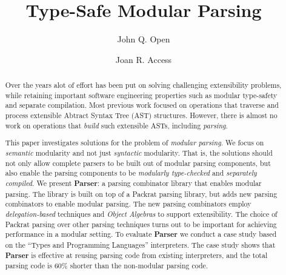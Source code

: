 \documentclass[a4paper,UKenglish]{lipics}
\title{Type-Safe Modular Parsing}
\author[1]{John Q. Open}
\author[2]{Joan R. Access}
\affil[1]{Dummy University Computing Laboratory\\
  Address, Country\\
  \texttt{open@dummyuni.org}}
\affil[2]{Department of Informatics, Dummy College\\
  Address, Country\\
  \texttt{access@dummycollege.org}}
\newcommand\name{\textbf{Parser}\xspace}
\begin{document}
\maketitle

\begin{abstract}

  Over the years alot of effort has been put on solving challenging
  extensibility problems, while retaining important software
  engineering properties such as modular type-safety and
  separate compilation. Most previous work focused on
  operations that traverse and process extensible Abtract Syntax Tree
  (AST) structures. However, there is almost no work on operations that
  \emph{build} such extensible ASTs, including \emph{parsing}.

  This paper investigates solutions for the problem of \emph{modular
    parsing}. We focus on \emph{semantic} modularity and not just
  \emph{syntactic} modularity. That is, the solutions should not only
  allow complete parsers to be built out of modular parsing
  components, but also enable the parsing components to be \emph{modularly
  type-checked} and \emph{separately compiled}. We present \name: a parsing
  combinator library that enables modular parsing. The library is
  built on top of a Packrat parsing library, but adds new parsing
  combinators to enable modular parsing. The new parsing combinators 
  employ \emph{delegation-based} techniques and \emph{Object Algebras} 
  to support extensibility. The choice of Packrat parsing over other
  parsing techniques turns out to be important for achieving
  performance in a modular setting. To evaluate \name 
  we conduct a  case study based on the 
  ``Types and Programming Languages'' interpreters. The case study 
  shows that \name is effective at reusing parsing code from existing
  interpreters, and the total parsing code is 60\% shorter than the
  non-modular parsing code.

\end{abstract}



%

\end{document}
